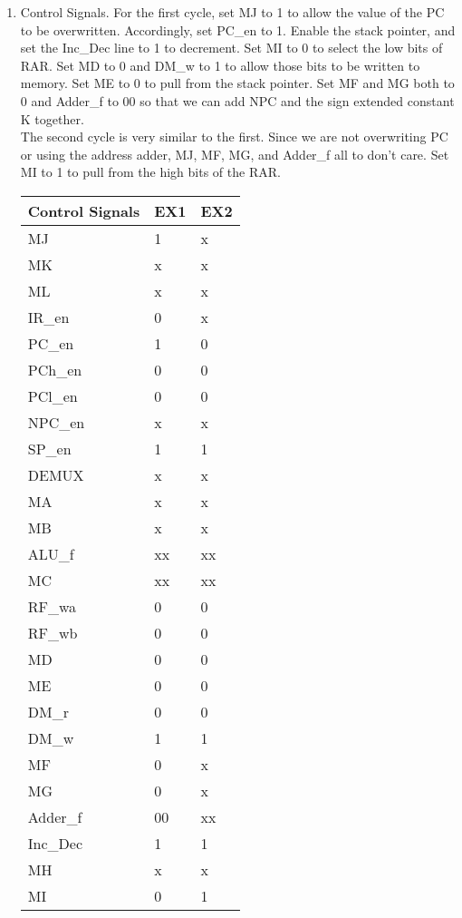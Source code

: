 \documentclass[12pt,letterpaper]{article}
\begin{document}
\begin{enumerate}
\begin{enumerate}
        \item Control Signals. For the first cycle, set MJ to 1 to allow the value of the PC to be overwritten. Accordingly, set PC\_en to 1. Enable the stack pointer, and set the Inc\_Dec line to 1 to decrement. Set MI to 0 to select the low bits of RAR. Set MD to 0 and DM\_w to 1 to allow those bits to be written to memory. Set ME to 0 to pull from the stack pointer. Set MF and MG both to 0 and Adder\_f to 00 so that we can add NPC and the sign extended constant K together.\\
        The second cycle is very similar to the first. Since we are not overwriting PC or using the address adder, MJ, MF, MG, and Adder\_f all to don't care. Set MI to 1 to pull from the high bits of the RAR.\\
            \begin{tabular}{l l l}
                 Control Signals & EX1 & EX2 \\
                 \hline
                 MJ & 1 & x \\
                 MK & x & x \\
                 ML & x & x \\
                 IR\_en & 0 & x \\
                 PC\_en & 1 & 0 \\
                 PCh\_en & 0 & 0 \\
                 PCl\_en & 0 & 0 \\
                 NPC\_en & x & x \\
                 SP\_en & 1 & 1 \\
                 DEMUX & x & x \\
                 MA & x & x \\
                 MB & x & x \\
                 ALU\_f & xx & xx \\
                 MC & xx & xx \\
                 RF\_wa & 0 & 0 \\
                 RF\_wb & 0 & 0 \\
                 MD & 0 & 0 \\
                 ME & 0 & 0 \\
                 DM\_r & 0 & 0 \\
                 DM\_w & 1 & 1 \\
                 MF & 0 & x \\
                 MG & 0 & x \\
                 Adder\_f & 00 & xx \\
                 Inc\_Dec & 1 & 1 \\
                 MH & x & x \\
                 MI & 0 & 1 \\
            \end{tabular}


\end{enumerate}
\end{enumerate}
\end{document}
